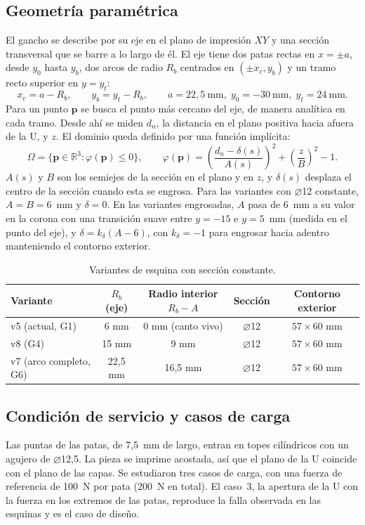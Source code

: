 \documentclass[11pt,a4paper]{article}
\begin{document}
\subsection{Geometría paramétrica}
El gancho se describe por su eje en el plano de impresión $XY$ y una sección transversal que se barre a lo largo de él. El eje tiene dos patas rectas en $x=\pm a$, desde $y_0$ hasta $y_b$, dos arcos de radio $R_b$ centrados en $(\pm x_c, y_b)$ y un tramo recto superior en $y=y_t$:
\begin{equation}
x_c = a - R_b, \qquad y_b = y_t - R_b, \qquad a = 22{,}5~\text{mm},\; y_0=-30~\text{mm},\; y_t = 24~\text{mm}.
\end{equation}
Para un punto $\mathbf p$ se busca el punto más cercano del eje, de manera analítica en cada tramo. Desde ahí se miden $d_n$, la distancia en el plano positiva hacia afuera de la U, y $z$. El dominio queda definido por una función implícita:
\begin{equation}
\Omega = \{\mathbf p\in\mathbb R^3 : \varphi(\mathbf p)\le 0\},\qquad
\varphi(\mathbf p) = \left(\frac{d_n-\delta(s)}{A(s)}\right)^2 + \left(\frac{z}{B}\right)^2 - 1 .
\end{equation}
$A(s)$ y $B$ son los semiejes de la sección en el plano y en $z$, y $\delta(s)$ desplaza el centro de la sección cuando esta se engrosa. Para las variantes con $\varnothing$12 constante, $A=B=6$~mm y $\delta=0$. En las variantes engrosadas, $A$ pasa de 6~mm a su valor en la corona con una transición suave entre $y=-15$ e $y=5$~mm (medida en el punto del eje), y $\delta = k_\delta(A-6)$, con $k_\delta=-1$ para engrosar hacia adentro manteniendo el contorno exterior.

\begin{table}[htbp]\centering\small
\caption{Variantes de esquina con sección constante.}
\begin{tabular}{lcccc}\toprule
Variante & $R_b$ (eje) & Radio interior $R_b-A$ & Sección & Contorno exterior\\\midrule
v5 (actual, G1) & 6 mm & 0 mm (canto vivo) & $\varnothing$12 & $57\times60$ mm\\
v8 (G4) & 15 mm & 9 mm & $\varnothing$12 & $57\times60$ mm\\
v7 (arco completo, G6) & 22,5 mm & 16,5 mm & $\varnothing$12 & $57\times60$ mm\\\bottomrule
\end{tabular}\end{table}

\subsection{Condición de servicio y casos de carga}
Las puntas de las patas, de 7,5~mm de largo, entran en topes cilíndricos con un agujero de $\varnothing$12,5. La pieza se imprime acostada, así que el plano de la U coincide con el plano de las capas. Se estudiaron tres casos de carga, con una fuerza de referencia de 100~N por pata (200~N en total). El caso~3, la apertura de la U con la fuerza en los extremos de las patas, reproduce la falla observada en las esquinas y es el caso de diseño.
\end{document}
